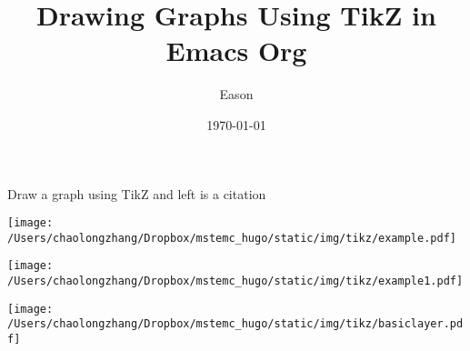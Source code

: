 \documentclass[koma,utopia,a4paper,captions=tableheading,11pt,listings-sv,microtype,paralist,colorlinks=true,urlcolor=blue]{org-article}
\author{Eason}
\date{\today}
\title{Drawing Graphs Using TikZ in Emacs Org}
\begin{document}
\maketitle
\tableofcontents



Draw a graph using TikZ \cite{Fossorier_2005} and left is a citation


\begin{center}
\texttt{[image: /Users/chaolongzhang/Dropbox/mstemc\_hugo/static/img/tikz/example.pdf]}
\end{center}

\begin{center}
\texttt{[image: /Users/chaolongzhang/Dropbox/mstemc\_hugo/static/img/tikz/example1.pdf]}
\end{center}

\begin{center}
\texttt{[image: /Users/chaolongzhang/Dropbox/mstemc\_hugo/static/img/tikz/basiclayer.pdf]}
\end{center}



\end{document}

